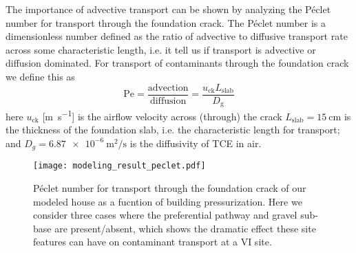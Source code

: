 The importance of advective transport can be shown by analyzing the Péclet number for transport through the foundation crack.
The Péclet number is a dimensionless number defined as the ratio of advective to diffusive transport rate across some characteristic length, i.e. it tell us if transport is advective or diffusion dominated.
For transport of contaminants through the foundation crack we define this as
\begin{equation}\label{eq:peclet_number}
  \mathrm{Pe} = \frac{\mathrm{advection}}{\mathrm{diffusion}} = \frac{u_\mathrm{ck} L_\mathrm{slab}}{D_\mathrm{g}}
\end{equation}
here $u_\mathrm{ck}$ [\si{\metre\per\second}] is the airflow velocity across (through) the crack
$L_\mathrm{slab} = \SI{15}{\centi\metre}$ is the thickness of the foundation slab, i.e. the characteristic length for transport;
and $D_g = \SI{6.87e-6}{\metre\squared\per\second}$ is the diffusivity of TCE in air.\par

\begin{figure}[htb!]
  \centering
  \texttt{[image: modeling\_result\_peclet.pdf]}
  \caption[Péclet number for transport through the modeled foundation crack.]{Péclet number for transport through the foundation crack of our modeled house as a fucntion of building pressurization. Here we consider three cases where the preferential pathway and gravel sub-base are present/absent, which shows the dramatic effect these site features can have on contaminant transport at a VI site.}
  \label{fig:peclet_number}
\end{figure}

